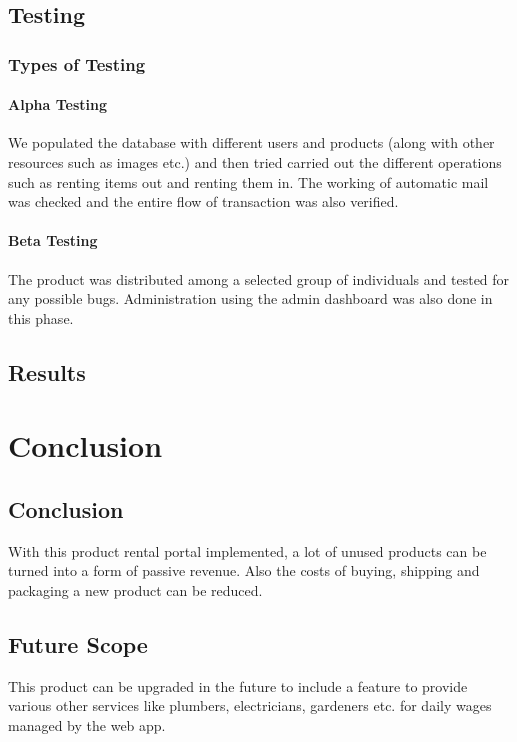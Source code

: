 \documentclass[11pt]{report}
\begin{document}
\section{Testing}

\subsection{Types of Testing}
\subsubsection{Alpha Testing}
We populated the database with different users and products (along with other resources such as images etc.) and then tried carried out the different operations such as renting items out and renting them in. The working of automatic mail was checked and the entire flow of transaction was also verified.
\subsubsection{Beta Testing}
The product was distributed among a selected group of individuals and tested for any possible
bugs. Administration using the admin dashboard was also done in this phase.
\section{Results}


\chapter{Conclusion}
\label {con}
\section{Conclusion}
With this product rental portal implemented, a lot of unused products can be turned into a form of passive revenue. Also the costs of buying, shipping and packaging a new product can be reduced.
\section{Future Scope}
This product can be upgraded in the future to include a feature to provide various other services like plumbers, electricians, gardeners etc. for daily wages managed by the web app.
\end{document}
